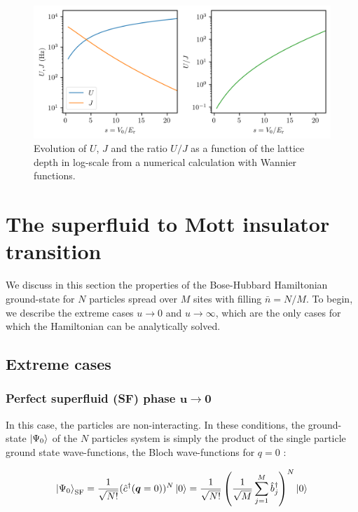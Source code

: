 \begin{figure}
    \centering
    \includegraphics[width=\textwidth]{Fig/Chapter2/U_J_vs_s.png}
    \caption[Evolution of $U$, $J$ and the ratio $U/J$ as a function of the lattice depth in log-scale]{Evolution of $U$, $J$ and the ratio $U/J$ as a function of the lattice depth in log-scale from a numerical calculation with Wannier functions.}
    \label{fig:U_J_vs_s}
\end{figure}

\section{The superfluid to Mott insulator transition}

We discuss in this section the properties of the Bose-Hubbard Hamiltonian ground-state for $N$ particles spread over $M$ sites with filling $\bar{n}=N/M$. To begin, we describe the extreme cases $u \to 0$ and $u \to \infty$, which are the only cases for which the Hamiltonian can be analytically solved. 

\subsection{Extreme cases}

\subsubsection{Perfect superfluid (SF) phase $\bm{u \to 0}$}

In this case, the particles are non-interacting. In these conditions, the ground-state $\ket{\Psi_0}$ of the $N$ particles system is simply the product of the single particle ground state wave-functions, \ie the Bloch wave-functions for $q=0$ \cite{bloch2008many}:

\begin{equation}
    \ket{\Psi_0}_{\mathrm{SF}} = \frac{1}{\sqrt{N!}} (\hat{c}^{\dagger}(\bm{q}=0))^N \ket{0} = \frac{1}{\sqrt{N !}}\left(\frac{1}{\sqrt{M}} \sum_{j=1}^{M} \hat{b}_{j}^{\dagger}\right)^{N} \ket{0}
\end{equation}

